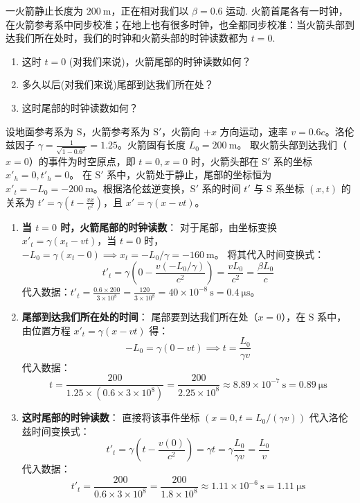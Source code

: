 \begin{exercise}\label{ex:9.3}
一火箭静止长度为 $200 \ \mathrm{m}$，正在相对我们以 $\beta = 0.6$ 运动. 火箭首尾各有一时钟，在火箭参考系中同步校准；在地上也有很多时钟，也全都同步校准：当火箭头部到达我们所在处时，我们的时钟和火箭头部的时钟读数都为 $t=0$.
\begin{enumerate}
  \item[(a)] 这时 $t=0$ (对我们来说)，火箭尾部的时钟读数如何？
  \item[(b)] 多久以后(对我们来说)尾部到达我们所在处？
  \item[(c)] 这时尾部的时钟读数如何？
\end{enumerate}
\end{exercise}
\begin{solution}
设地面参考系为 $\mathrm{S}$，火箭参考系为 $\mathrm{S}'$，火箭向 $+x$ 方向运动，速率 $v = 0.6c$。洛伦兹因子 $\gamma = \frac{1}{\sqrt{1-0.6^2}} = 1.25$。火箭固有长度 $L_0 = 200 \ \mathrm{m}$。
取火箭头部到达我们（$x=0$）的事件为时空原点，即 $t=0, x=0$ 时，火箭头部在 $\mathrm{S}'$ 系的坐标 $x'_h=0, t'_h=0$。
在 $\mathrm{S}'$ 系中，火箭处于静止，尾部的坐标恒为 $x'_t = -L_0 = -200 \ \mathrm{m}$。根据洛伦兹逆变换，$\mathrm{S}'$ 系的时间 $t'$ 与 $\mathrm{S}$ 系坐标 $(x,t)$ 的关系为 $t' = \gamma(t - \frac{vx}{c^2})$，且 $x' = \gamma(x - vt)$。

\begin{enumerate}
    \item[(a)] \textbf{当 $t=0$ 时，火箭尾部的时钟读数}：
    对于尾部，由坐标变换 $x'_t = \gamma(x_t - vt)$，当 $t=0$ 时，$-L_0 = \gamma(x_t - 0) \implies x_t = -L_0/\gamma = -160 \ \mathrm{m}$。
    将其代入时间变换式：
    $$ t'_t = \gamma \left( 0 - \frac{v(-L_0/\gamma)}{c^2} \right) = \frac{v L_0}{c^2} = \frac{\beta L_0}{c} $$
    代入数据：$t'_t = \frac{0.6 \times 200}{3 \times 10^8} = \frac{120}{3 \times 10^8} = 40 \times 10^{-8} \ \mathrm{s} = 0.4 \ \mathrm{\mu s}$。

    \item[(b)] \textbf{尾部到达我们所在处的时间}：
    尾部要到达我们所在处（$x=0$），在 $\mathrm{S}$ 系中，由位置方程 $x'_t = \gamma(x - vt)$ 得：
    $$ -L_0 = \gamma(0 - vt) \implies t = \frac{L_0}{\gamma v} $$
    代入数据：
    $$ t = \frac{200}{1.25 \times (0.6 \times 3 \times 10^8)} = \frac{200}{2.25 \times 10^8} \approx 8.89 \times 10^{-7} \ \mathrm{s} = 0.89 \ \mathrm{\mu s} $$

    \item[(c)] \textbf{这时尾部的时钟读数}：
    直接将该事件坐标 $(x=0, t = L_0/(\gamma v))$ 代入洛伦兹时间变换式：
    $$ t'_t = \gamma \left( t - \frac{v(0)}{c^2} \right) = \gamma t = \gamma \frac{L_0}{\gamma v} = \frac{L_0}{v} $$
    代入数据：
    $$ t'_t = \frac{200}{0.6 \times 3 \times 10^8} = \frac{200}{1.8 \times 10^8} \approx 1.11 \times 10^{-6} \ \mathrm{s} = 1.11 \ \mathrm{\mu s} $$
\end{enumerate}
\end{solution}

